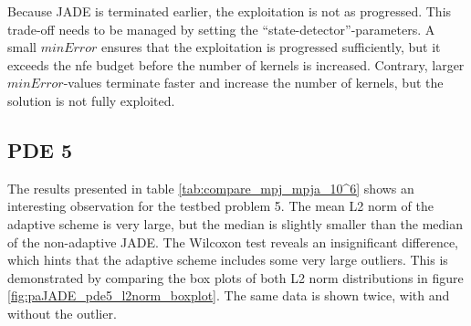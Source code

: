 \documentclass[./\jobname.tex]{subfiles}
\begin{document}
\begin{figure}[H]
	\centering
	\noindent{}
	\label{fig:subexperiment_pde2347_kernels_l2norm}
\end{figure}

Because JADE is terminated earlier, the exploitation is not as progressed. This trade-off needs to be managed by setting the ``state-detector''-parameters. A small $minError$ ensures that the exploitation is progressed sufficiently, but it exceeds the \gls{nfe} budget before the number of kernels is increased. Contrary, larger $minError$-values terminate faster and increase the number of kernels, but the solution is not fully exploited. 

\subsection{PDE 5}

The results presented in table \ref{tab:compare_mpj_mpja_10^6} shows an interesting observation for the testbed problem 5. The mean L2 norm of the adaptive scheme is very large, but the median is slightly smaller than the median of the non-adaptive JADE. The Wilcoxon test reveals an insignificant difference, which hints that the adaptive scheme includes some very large outliers. This is demonstrated by comparing the box plots of both L2 norm distributions in figure \ref{fig:paJADE_pde5_l2norm_boxplot}. The same data is shown twice, with and without the outlier. 
\end{document}
